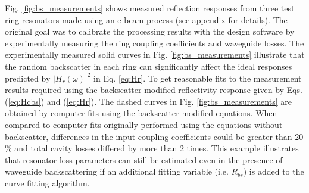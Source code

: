 \documentclass[10pt]{article}
\begin{document}
Fig. \ref{fig:bs_measurements} shows measured reflection responses from three test ring resonators made using an e-beam process (see appendix for details). The original goal was to calibrate the processing results with the design software by experimentally measuring the ring coupling coefficients and waveguide losses.  The experimentally measured solid curves in Fig. \ref{fig:bs_measurements} illustrate that the random backscatter in each ring can significantly affect the ideal responses predicted by $|H_r(\omega)|^2$ in Eq. \ref{eq:Hr}.  To get reasonable fits to the measurement results required using the backscatter modified reflectivity response given by Eqs. (\ref{eq:Hcbs}) and (\ref{eq:Hr}).  The dashed curves in Fig. \ref{fig:bs_measurements} are obtained by computer fits using the backscatter modified equations.  When compared to computer fits originally performed using the equations without backscatter, differences in the input coupling coefficients could be greater than 20$\%$ and total cavity losses differed by more than 2 times.  This example illustrates that resonator loss parameters can still be estimated even in the presence of waveguide backscattering if an additional fitting variable (i.e. $R_{bs}$) is added to the curve fitting algorithm.  



\label{sec:measurements}
\end{document}
